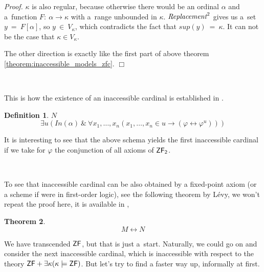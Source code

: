 \documentclass[12pt,a4paper]{article}
\newtheorem{theorem}{Theorem}[section]
\newtheorem{definition}[theorem]{Definition}
\newenvironment{proof}
{\noindent \textit{Proof.}}
{\hspace*{\fill} $\Box$}
\renewcommand{\iff}{\leftrightarrow}
\newcommand{\then}{\rightarrow}
\begin{document}
\begin{}
\begin{proof}
$\kappa$ is also regular, because otherwise there would be an ordinal $\alpha$ and a~function $F:\ \alpha \then \kappa$ with a~range unbounded in $\kappa$. 
$\emph{Replacement}^2$ gives us a~set $y\ =\ F[\alpha]$, so $y\ \in\ V_\kappa$, which contradicts the fact that $sup(y)\ =\ \kappa$. It can not be the case that $\kappa \in V_\kappa$.
\

The other direction is exactly like the first part of above theorem \ref{theorem:inaccessible_models_zfc}.
\end{proof}

\

This is how the existence of an inaccessible cardinal is established in \cite{Levy60a}. 
\begin{definition}{$N$}\\
\begin{equation}
\exists u (In(\alpha)\ \&\ \forall x_1, \ldots, x_n (x_1, \ldots, x_n \in u \then (\varphi \iff \varphi^u)))
\end{equation}
\end{definition}
It is interesting to see that the above schema yields the first inaccessible cardinal if we take for $\varphi$ the conjunction of all axioms of $\sf{ZF_2}$.

\

To see that inaccessible cardinal can be also obtained by a fixed-point axiom (or a scheme if were in first-order logic), see the following theorem by Lévy, we won't repeat the proof here, it is available in \cite[Theorem 3]{Levy60a}, 
\begin{theorem}\label{theorem:levy_m_iff_n}
\begin{equation}
M \iff N
\end{equation}
\end{theorem}



We have transcended $\sf{ZF}$, but that is just a~start. Naturally, we could go on and consider the next inaccessible cardinal, which is inaccessible with respect to the theory $\sf{ZF} + \exists \kappa (\kappa \models \sf{ZF})$. But let's try to find a faster way up, informally at first. 


\end{}
\end{document}
